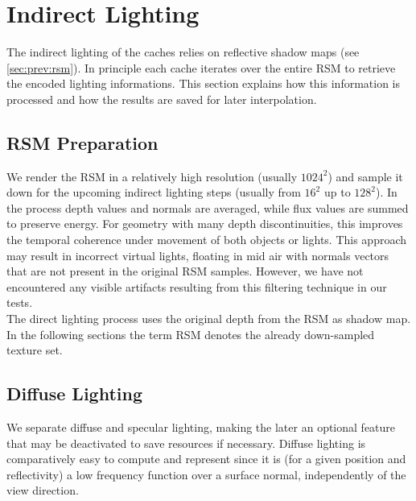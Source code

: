 \documentclass[thesis.tex]{subfiles}
\begin{document}
\section{Indirect Lighting}
The indirect lighting of the caches relies on reflective shadow maps (see \autoref{sec:prev:rsm}).
In principle each cache iterates over the entire RSM to retrieve the encoded lighting informations.
This section explains how this information is processed and how the results are saved for later interpolation.

\subsection{RSM Preparation}
We render the RSM in a relatively high resolution (usually $1024^2$) and sample it down for the upcoming indirect lighting steps (usually from $16^2$ up to $128^2$).
In the process depth values and normals are averaged, while flux values are summed to preserve energy.
For geometry with many depth discontinuities, this improves the temporal coherence under movement of both objects or lights.
This approach may result in incorrect virtual lights, floating in mid air with normals vectors that are not present in the original RSM samples.
However, we have not encountered any visible artifacts resulting from this filtering technique in our tests.
\\
The direct lighting process uses the original depth from the RSM as shadow map.
In the following sections the term RSM denotes the already down-sampled texture set.

\subsection{Diffuse Lighting} \label{sec:impl:diffuse}
We separate diffuse and specular lighting, making the later an optional feature that may be deactivated to save resources if necessary.
Diffuse lighting is comparatively easy to compute and represent since it is (for a given position and reflectivity) a low frequency function over a surface normal, independently of the view direction.

\end{document}
